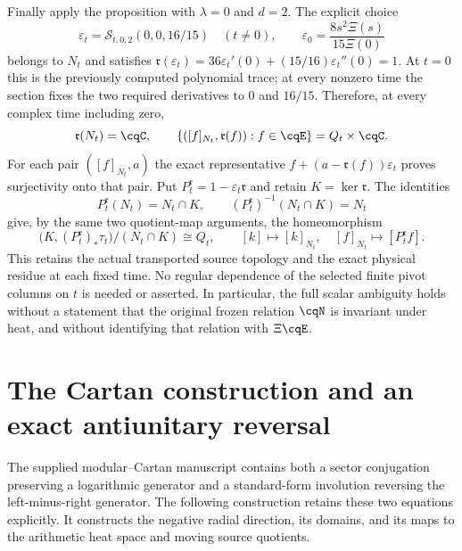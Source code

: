 Finally apply the proposition with $\lambda=0$ and $d=2$.
The explicit choice
\begin{equation}
 \varepsilon_t=\mathcal S_{t,0,2}(0,0,16/15)\quad(t\ne0),
 \qquad \varepsilon_0=\frac{8s^2\Xi(s)}{15\Xi(0)}
 \label{eq:cq-moving-residue-section}
\end{equation}
belongs to $N_t$ and satisfies
$\mathfrak r(\varepsilon_t)
 =36\varepsilon_t'(0)+(15/16)\varepsilon_t''(0)=1$.
At $t=0$ this is the previously computed polynomial trace;
at every nonzero time the section fixes the two required
derivatives to $0$ and $16/15$. Therefore, at every complex
time including zero,
\begin{equation}
 \mathfrak r(N_t)=\cqC,\qquad
 \{([f]_{N_t},\mathfrak r(f)):f\in\cqE\}
      =Q_t\times\cqC.
 \label{eq:cq-all-times-residue-ambiguity}
\end{equation}
For each pair $([f]_{N_t},a)$ the exact representative
$f+(a-\mathfrak r(f))\varepsilon_t$ proves surjectivity onto that
pair. Put $P_t^{\mathfrak r}=1-\varepsilon_t\mathfrak r$ and
retain $K=\ker\mathfrak r$. The identities
\[
 P_t^{\mathfrak r}(N_t)=N_t\cap K,
 \qquad (P_t^{\mathfrak r})^{-1}(N_t\cap K)=N_t
\]
give, by the same two quotient-map arguments, the homeomorphism
\begin{equation}
 \bigl(K,(P_t^{\mathfrak r})_*\tau_t\bigr)/(N_t\cap K)
      \cong Q_t,
 \qquad [k]\mapsto[k]_{N_t},\quad
 [f]_{N_t}\mapsto[P_t^{\mathfrak r}f].
 \label{eq:cq-all-times-residue-source-quotient}
\end{equation}
This retains the actual transported source topology and
the exact physical residue at each fixed time. No
regular dependence of the selected finite pivot columns
on $t$ is needed or asserted. In particular, the full
scalar ambiguity holds without a statement that the
original frozen relation $\cqN$ is invariant under heat,
and without identifying that relation with $\Xi\cqE$.

\section{The Cartan construction and an exact antiunitary reversal}
\label{sec:cq-cartan-heat}

The supplied modular--Cartan manuscript \cite{cqCartan} contains both
a sector conjugation preserving a logarithmic generator and a
standard-form involution reversing the left-minus-right generator.
The following construction retains these two equations explicitly.
It constructs the negative radial direction, its domains, and its
maps to the arithmetic heat space and moving source quotients.

